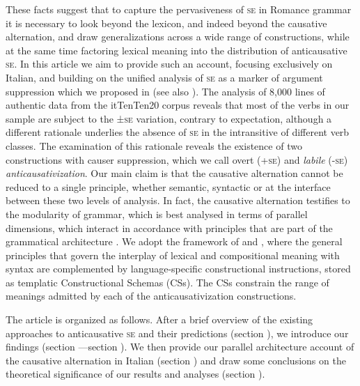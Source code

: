 \documentclass[output=paper,colorlinks,citecolor=brown
]{langscibook}
\begin{document}
These facts suggest that to capture the pervasiveness of \textsc{se} in Romance grammar it is necessary to look beyond the lexicon, and indeed beyond the causative alternation, and draw generalizations across a wide range of constructions, while at the same time factoring lexical meaning into the distribution of anticausative \textsc{se}. In this article we aim to provide such an account, focusing exclusively on Italian, and building on the unified analysis of \textsc{se} as a marker of argument suppression which we proposed in \citet{bentley2006split} (see also \cite{vanvalin1990semantic,centineo1995distribution}). The analysis of 8,000 lines of authentic data from the itTenTen20 corpus \citep{jakubicek2013tenten} reveals that most of the verbs in our sample are subject to the ±\textsc{se} variation, contrary to expectation, although a different rationale underlies the absence of \textsc{se} in the intransitive of different verb classes.  The examination of this rationale reveals the existence of two constructions with causer suppression, which we call \textit{}{overt} (+\textsc{se}) and \textit{labile} (-\textsc{se}) \textit{anticausativization}. Our main claim is that the causative alternation cannot be reduced to a single principle, whether semantic, syntactic or at the interface between these two levels of analysis. In fact, the causative alternation testifies to the modularity of grammar, which is best analysed in terms of parallel dimensions, which interact in accordance with principles that are part of the grammatical architecture \citep{bresnan1989locative,vanvalin1997syntax,jackendoff2002foundations,vanvalin2005exploring,vanvalin2023principles}. We adopt the framework of \citet{vanvalin1997syntax} and \citet{vanvalin2005exploring,vanvalin2023principles}, where the general principles that govern the interplay of lexical and compositional meaning with syntax are complemented by language-specific constructional instructions, stored as templatic Constructional Schemas (CSs). The CSs constrain the range of meanings admitted by each of the anticausativization constructions. 

The article is organized as follows. After a brief overview of the existing approaches to anticausative \textsc{se} and their predictions (section ), we introduce our findings (section —section ). We then provide our parallel architecture account of the causative alternation in Italian (section ) and draw some conclusions on the theoretical significance of our results and analyses (section ). 
\end{document}
